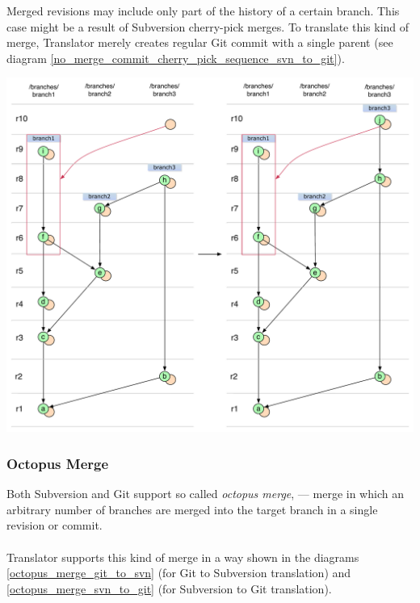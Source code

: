 Merged revisions may include only part of the history of a certain branch. 
This case might be a result of Subversion cherry-pick merges.
To translate this kind of merge, Translator merely creates regular Git commit with a single parent (see diagram \ref{no_merge_commit_cherry_pick_sequence_svn_to_git}). 

\begin{center}
\includegraphics[width=\textwidth]{img/diagrams/no_merge_commit_cherry_pick_sequence_svn_to_git.pdf}%
\label{no_merge_commit_cherry_pick_sequence_svn_to_git}%
\end{center}

\subsubsection{Octopus Merge}

Both Subversion and Git support so called \emph{octopus merge}, --- merge in which an arbitrary number of branches are merged into the target branch in a single revision or commit. 
\\\\
Translator supports this kind of merge in a way shown in the diagrams \ref{octopus_merge_git_to_svn} (for Git to Subversion translation) and \ref{octopus_merge_svn_to_git} (for Subversion to Git translation).

